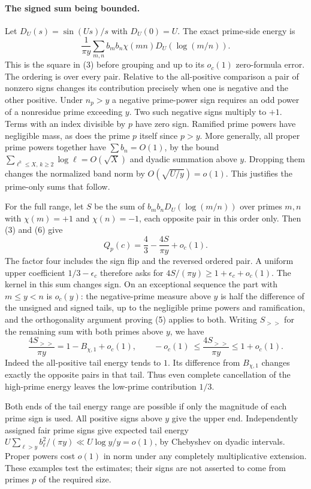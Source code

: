\documentclass[11pt]{article}
\begin{document}
\paragraph{The signed sum being bounded.}
Let $D_U(s)=\sin(Us)/s$ with $D_U(0)=U$. The exact prime-side energy is
\[
 \frac{1}{\pi y}\sum_{m,n} b_m b_n\chi(mn)D_U(\log(m/n)).
 \tag{6}
\]
This is the square in (3) before grouping and up to its $o_c(1)$
zero-formula error. The ordering is over every pair. Relative to
the all-positive comparison a pair of nonzero signs changes its
contribution precisely when one is negative and the other positive.
Under $n_p>y$ a negative prime-power sign requires an odd power of
a nonresidue prime exceeding $y$. Two such negative signs multiply
to $+1$. Terms with an index divisible by $p$ have zero sign.
Ramified prime powers have negligible mass, as does the prime $p$
itself since $p>y$. More generally, all proper prime powers together
have $\sum b_n=O(1)$, by the bound
$\sum_{\ell^k\le X,\,k\ge2}\log\ell=O(\sqrt X)$ and dyadic summation
above $y$. Dropping them changes the normalized band norm by
$O(\sqrt{U/y})=o(1)$. This justifies the prime-only sums that follow.

For the full range, let $S$ be the sum of $b_m b_nD_U(\log(m/n))$
over primes $m,n$ with $\chi(m)=+1$ and $\chi(n)=-1$, each opposite
pair in this order only. Then (3) and (6) give
\[
 Q_p(c)=\frac43-\frac{4S}{\pi y}+o_c(1).
 \tag{7}
\]
The factor four includes the sign flip and the reversed ordered pair.
A uniform upper coefficient $1/3-\epsilon_c$ therefore asks for
$4S/(\pi y)\ge1+\epsilon_c+o_c(1)$. The kernel in this sum changes
sign. On an exceptional sequence the part with $m\le y<n$ is $o_c(y)$:
the negative-prime measure above $y$ is half the difference of the
unsigned and signed tails, up to the negligible prime powers and
ramification, and the orthogonality argument proving (5) applies to both.
Writing $S_{>>}$ for the remaining sum with both primes above $y$, we have
\[
 \frac{4S_{>>}}{\pi y}=1-B_{\chi,1}+o_c(1),
 \qquad -o_c(1)\ \le\frac{4S_{>>}}{\pi y}\le1+o_c(1).
 \tag{8}
\]
Indeed the all-positive tail energy tends to $1$. Its difference
from $B_{\chi,1}$ changes exactly the opposite pairs in that tail.
Thus even complete cancellation of the high-prime energy leaves
the low-prime contribution $1/3$.

Both ends of the tail energy range are possible if only the magnitude
of each prime sign is used. All positive signs above $y$ give the
upper end. Independently assigned fair prime signs give expected
tail energy $U\sum_{\ell>y} b_\ell^2/(\pi y)\ll U\log y/y=o(1)$,
by Chebyshev on dyadic intervals. Proper powers cost $o(1)$ in norm
under any completely multiplicative extension. These examples test
the estimates; their signs are not asserted to come from primes $p$
of the required size.
\end{document}
